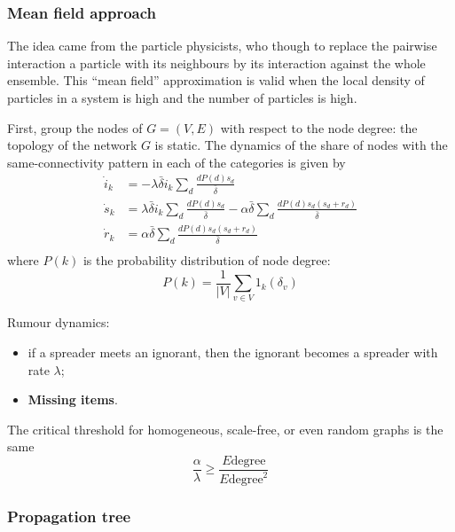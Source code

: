 \documentclass[a4paper]{article}
\begin{document}

\subsubsection{Mean field approach} %
\label{ssub:mean_field_approach}

The idea came from the particle physicists, who though to replace the pairwise
interaction a particle with its neighbours by its interaction against the whole
ensemble. This ``mean field'' approximation is valid when the local density of 
particles in a system is high and the number of particles is high.

First, group the nodes of $G = (V,E)$ with respect to the node degree:
the topology of the network $G$ is static. The dynamics of the share of nodes with
the same-connectivity pattern in each of the categories is given by
\begin{align*}
	\dot{i}_k &= -\lambda \bar{\delta} i_k \sum_{ d } \frac{ d P(d) s_d}{\bar{\delta}}\\
	\dot{s}_k &= \lambda \bar{\delta} i_k \sum_{ d } \frac{ d P(d) s_d}{\bar{\delta}}
		- \alpha \bar{\delta} \sum_{ d } \frac{ d P(d) s_d (s_d + r_d) }{\bar{\delta}}\\
	\dot{r}_k &= \alpha \bar{\delta} \sum_{ d } \frac{ d P(d) s_d (s_d + r_d) }{\bar{\delta}}\\
\end{align*}
where $P(k)$ is the probability distribution of node degree:
\[P(k) = \frac{1}{|V|} \sum_{v\in V} 1_{k}(\delta_v)\]



Rumour dynamics:
\begin{itemize}
	\item if a spreader meets an ignorant, then the ignorant becomes a spreader with rate $\lambda$;
	\item \textbf{Missing items}.
\end{itemize}

The critical threshold for homogeneous, scale-free, or even random graphs is the same
\[\frac{\alpha}{\lambda} \geq \frac{E \text{degree}}{E \text{degree}^2}\]


\subsubsection{Propagation tree} %
\label{ssub:propagation_tree}
\end{document}
